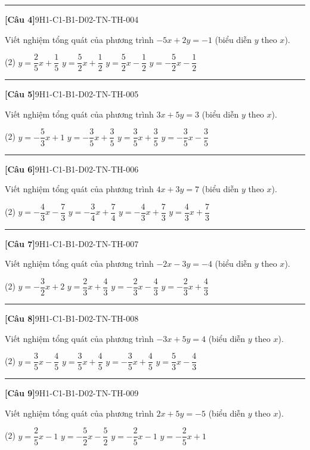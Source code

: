 \documentclass[12pt,a4paper]{article}
\newif\ifloigiai
\newenvironment{cauhoi}[2]{%
  \par\medskip\noindent\rule{\textwidth}{0.4pt}\par\nopagebreak
  \noindent\textbf{[#1]}\hfill{\scriptsize\ttfamily #2}\par\nopagebreak\smallskip}{\par}
\newcommand{\dapan}[1]{\ifloigiai\par\smallskip\noindent\textit{Đáp án:} \textbf{#1}\par\fi}
\begin{document}
\begin{cauhoi}{Câu 4}{9H1-C1-B1-D02-TN-TH-004}
Viết nghiệm tổng quát của phương trình $-5x+2y=-1$ (biểu diễn $y$ theo $x$).
\begin{tasks}(2)
\task $y=\dfrac{2}{5}x+\dfrac{1}{5}$
\task $y=\dfrac{5}{2}x+\dfrac{1}{2}$
\task $y=\dfrac{5}{2}x-\dfrac{1}{2}$
\task $y=-\dfrac{5}{2}x-\dfrac{1}{2}$
\end{tasks}
\dapan{C}
\end{cauhoi}
\begin{cauhoi}{Câu 5}{9H1-C1-B1-D02-TN-TH-005}
Viết nghiệm tổng quát của phương trình $3x+5y=3$ (biểu diễn $y$ theo $x$).
\begin{tasks}(2)
\task $y=-\dfrac{5}{3}x+1$
\task $y=-\dfrac{3}{5}x+\dfrac{3}{5}$
\task $y=\dfrac{3}{5}x+\dfrac{3}{5}$
\task $y=-\dfrac{3}{5}x-\dfrac{3}{5}$
\end{tasks}
\dapan{B}
\end{cauhoi}
\begin{cauhoi}{Câu 6}{9H1-C1-B1-D02-TN-TH-006}
Viết nghiệm tổng quát của phương trình $4x+3y=7$ (biểu diễn $y$ theo $x$).
\begin{tasks}(2)
\task $y=-\dfrac{4}{3}x-\dfrac{7}{3}$
\task $y=-\dfrac{3}{4}x+\dfrac{7}{4}$
\task $y=-\dfrac{4}{3}x+\dfrac{7}{3}$
\task $y=\dfrac{4}{3}x+\dfrac{7}{3}$
\end{tasks}
\dapan{C}
\end{cauhoi}
\begin{cauhoi}{Câu 7}{9H1-C1-B1-D02-TN-TH-007}
Viết nghiệm tổng quát của phương trình $-2x-3y=-4$ (biểu diễn $y$ theo $x$).
\begin{tasks}(2)
\task $y=-\dfrac{3}{2}x+2$
\task $y=\dfrac{2}{3}x+\dfrac{4}{3}$
\task $y=-\dfrac{2}{3}x-\dfrac{4}{3}$
\task $y=-\dfrac{2}{3}x+\dfrac{4}{3}$
\end{tasks}
\dapan{D}
\end{cauhoi}
\begin{cauhoi}{Câu 8}{9H1-C1-B1-D02-TN-TH-008}
Viết nghiệm tổng quát của phương trình $-3x+5y=4$ (biểu diễn $y$ theo $x$).
\begin{tasks}(2)
\task $y=\dfrac{3}{5}x-\dfrac{4}{5}$
\task $y=\dfrac{3}{5}x+\dfrac{4}{5}$
\task $y=-\dfrac{3}{5}x+\dfrac{4}{5}$
\task $y=\dfrac{5}{3}x-\dfrac{4}{3}$
\end{tasks}
\dapan{B}
\end{cauhoi}
\begin{cauhoi}{Câu 9}{9H1-C1-B1-D02-TN-TH-009}
Viết nghiệm tổng quát của phương trình $2x+5y=-5$ (biểu diễn $y$ theo $x$).
\begin{tasks}(2)
\task $y=\dfrac{2}{5}x-1$
\task $y=-\dfrac{5}{2}x-\dfrac{5}{2}$
\task $y=-\dfrac{2}{5}x-1$
\task $y=-\dfrac{2}{5}x+1$
\end{tasks}
\dapan{C}
\end{cauhoi}
\end{document}
